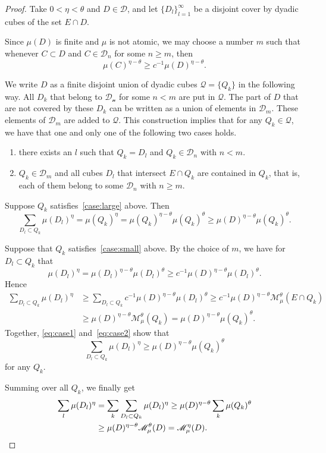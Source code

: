 \begin{proof}
Take $0 < \eta < \theta$ and $D \in \mathscr{D}$, and let $\{D_l\}_{l=1}^\infty$ be a disjoint cover by dyadic cubes of the set $E \cap D$.

Since $\mu (D)$ is finite and $\mu$ is not atomic, we may choose a number $m$ such that whenever $C \subset D$ and $C \in
\mathscr{D}_n$ for some $n \geq m$, then
\[
\mu (C)^{\eta-\theta} \geq c^{-1} \mu (D)^{\eta-\theta}.
\]

We write $D$ as a finite disjoint union of dyadic cubes $\mathscr{Q} = \{Q_k\}$ in the following way. All $D_k$ that belong to $\mathscr{D_n}$ for some $n < m$ are put in $\mathscr{Q}$. The part of $D$ that are not covered by these $D_k$ can be written as a union of elements in $\mathscr{D}_m$. These elements of $\mathscr{D}_m$ are added to $\mathscr{Q}$. This construction implies that for any $Q_k \in \mathscr{Q}$, we have that one and only one of the following two cases holds.
\renewcommand{\theenumi}{\roman{enumi}}
\begin{enumerate}
\item \label{case:large}
there exists an $l$ such that $Q_k = D_l$ and $Q_k \in
\mathscr{D}_n$ with $n < m$.
\item \label{case:small}
$Q_k \in \mathscr{D}_m$ and all cubes $D_l$ that intersect $E
\cap Q_k$ are contained in $Q_k$, that is, each of them belong to some $\mathscr{D}_n$ with $n \geq m$.
\end{enumerate}

Suppose $Q_k$ satisfies~\eqref{case:large} above. Then
\begin{equation}\label{eq:case1}
\sum_{D_l \subset Q_k} \mu (D_l)^\eta = \mu (Q_k)^\eta = \mu (Q_k)^{\eta-\theta} \mu (Q_k)^\theta \geq \mu (D)^{\eta-\theta}
\mu (Q_k)^\theta.
\end{equation}

Suppose that $Q_k$ satisfies~\eqref{case:small} above. By the choice of $m$, we have for $D_l \subset Q_k$ that
\[
\mu (D_l)^\eta = \mu (D_l)^{\eta-\theta} \mu (D_l)^\theta \geq c^{-1} \mu (D)^{\eta-\theta} \mu (D_l)^\theta.
\]
Hence
\begin{align}
\sum_{D_l \subset Q_k} \mu (D_l)^\eta &\geq \sum_{D_l \subset Q_k} c^{-1} \mu (D)^{\eta-\theta} \mu (D_l)^\theta \geq c^{-1} \mu (D)^{\eta-\theta} \mathscr{M}_\mu^\theta (E \cap Q_k) \nonumber
\\ &\geq \mu (D)^{\eta-\theta} \mathscr{M}_\mu^\theta (Q_k) = \mu (D)^{\eta-\theta} \mu (Q_k)^\theta. \label{eq:case2}
\end{align}
Together, \eqref{eq:case1} and~\eqref{eq:case2} show that
\[
\sum_{D_l \subset Q_k} \mu (D_l)^\eta \geq \mu (D)^{\eta-\theta} \mu (Q_k)^\theta
\]
for any $Q_k$.

Summing over all $Q_k$, we finally get
\begin{align*}
\sum_l \mu (D_l)^\eta &= \sum_k \sum_{D_l \subset Q_k} \mu (D_l)^\eta \geq \mu (D)^{\eta-\theta} \sum_k \mu (Q_k)^\theta
\\ &\geq \mu (D)^{\eta-\theta} \mathscr{M}_\mu^\theta (D) =
\mathscr{M}_\mu^\eta (D). \qedhere
\end{align*}
\end{proof}


